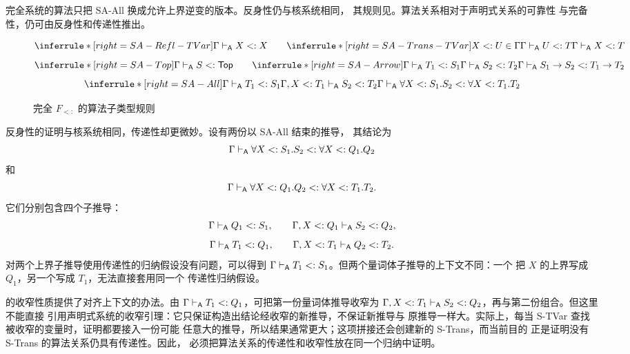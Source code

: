 完全系统的算法只把 SA-All 换成允许上界逆变的版本。反身性仍与核系统相同，
其规则见。算法关系相对于声明式关系的可靠性
与完备性，仍可由反身性和传递性推出。

\begin{figure}[!ht]
\centering
\begin{minipage}{0.96\linewidth}
  {}
  {}
\[
\inferrule*[right=SA-Refl-TVar]{ }
 {\Gamma\algturnstile X<:X}
\qquad
\inferrule*[right=SA-Trans-TVar]
 {X<:U\in\Gamma\\\Gamma\algturnstile U<:T}
 {\Gamma\algturnstile X<:T}
\]
\[
\inferrule*[right=SA-Top]{ }
 {\Gamma\algturnstile S<:\tapltype{Top}}
\qquad
\inferrule*[right=SA-Arrow]
 {\Gamma\algturnstile T_1<:S_1\\
  \Gamma\algturnstile S_2<:T_2}
 {\Gamma\algturnstile S_1\to S_2<:T_1\to T_2}
\]
\[
\inferrule*[right=SA-All]
 {\Gamma\algturnstile T_1<:S_1\\
  \Gamma,X<:T_1\algturnstile S_2<:T_2}
 {\Gamma\algturnstile
  \forall X<:S_1.S_2<:\forall X<:T_1.T_2}
\]
\end{minipage}
\caption{完全 \(F_{<:}\) 的算法子类型规则}
\label{fig:28-4}
\end{figure}

反身性的证明与核系统相同，传递性却更微妙。设有两份以 SA-All 结束的推导，
其结论为
\[
\Gamma\mathrel{\vdash_{\mathsf A}}
\forall X<:S_1.S_2<:\forall X<:Q_1.Q_2
\]
和
\[
\Gamma\mathrel{\vdash_{\mathsf A}}
\forall X<:Q_1.Q_2<:\forall X<:T_1.T_2.
\]
它们分别包含四个子推导：
\[
\Gamma\mathrel{\vdash_{\mathsf A}} Q_1<:S_1,\qquad
\Gamma,X<:Q_1\mathrel{\vdash_{\mathsf A}} S_2<:Q_2,
\]
\[
\Gamma\mathrel{\vdash_{\mathsf A}} T_1<:Q_1,\qquad
\Gamma,X<:T_1\mathrel{\vdash_{\mathsf A}} Q_2<:T_2.
\]
对两个上界子推导使用传递性的归纳假设没有问题，可以得到
\(\Gamma\mathrel{\vdash_{\mathsf A}} T_1<:S_1\)。但两个量词体子推导的上下文不同：一个
把 \(X\) 的上界写成 \(Q_1\)，另一个写成 \(T_1\)，无法直接套用同一个
传递性归纳假设。

的收窄性质提供了对齐上下文的办法。由
\(\Gamma\mathrel{\vdash_{\mathsf A}} T_1<:Q_1\)，可把第一份量词体推导收窄为
\(\Gamma,X<:T_1\mathrel{\vdash_{\mathsf A}} S_2<:Q_2\)，再与第二份组合。但这里不能直接
引用声明式系统的收窄引理：它只保证构造出结论经收窄的新推导，不保证新推导与
原推导一样大。实际上，每当 S-TVar 查找被收窄的变量时，证明都要接入一份可能
任意大的推导，所以结果通常更大；这项拼接还会创建新的 S-Trans，而当前目的
正是证明没有 S-Trans 的算法关系仍具有传递性。因此，
必须把算法关系的传递性和收窄性放在同一个归纳中证明。

